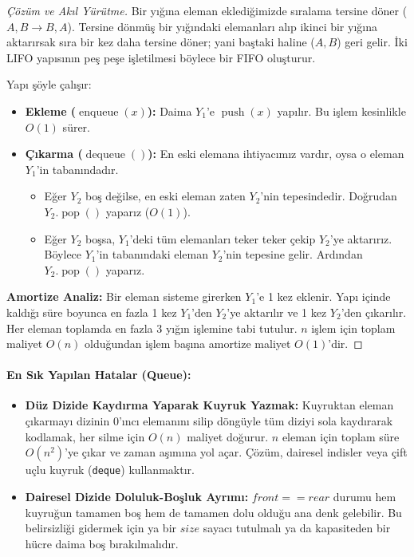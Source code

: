 \begin{proof}[Çözüm ve Akıl Yürütme]
Bir yığına eleman eklediğimizde sıralama tersine döner ($A, B \to B, A$). Tersine dönmüş bir yığındaki elemanları alıp ikinci bir yığına aktarırsak sıra bir kez daha tersine döner; yani baştaki haline ($A, B$) geri gelir. İki LIFO yapısının peş peşe işletilmesi böylece bir FIFO oluşturur.

Yapı şöyle çalışır:
\begin{itemize}
    \item \textbf{Ekleme ($\operatorname{enqueue}(x)$):} Daima $Y_1$'e $\operatorname{push}(x)$ yapılır. Bu işlem kesinlikle $O(1)$ sürer.
    \item \textbf{Çıkarma ($\operatorname{dequeue}()$):} En eski elemana ihtiyacımız vardır, oysa o eleman $Y_1$'in tabanındadır. 
    \begin{itemize}
        \item Eğer $Y_2$ boş değilse, en eski eleman zaten $Y_2$'nin tepesindedir. Doğrudan $Y_2.\operatorname{pop}()$ yaparız ($O(1)$).
        \item Eğer $Y_2$ boşsa, $Y_1$'deki tüm elemanları teker teker çekip $Y_2$'ye aktarırız. Böylece $Y_1$'in tabanındaki eleman $Y_2$'nin tepesine gelir. Ardından $Y_2.\operatorname{pop}()$ yaparız.
    \end{itemize}
\end{itemize}

\textbf{Amortize Analiz:} Bir eleman sisteme girerken $Y_1$'e 1 kez eklenir. Yapı içinde kaldığı süre boyunca en fazla 1 kez $Y_1$'den $Y_2$'ye aktarılır ve 1 kez $Y_2$'den çıkarılır. Her eleman toplamda en fazla 3 yığın işlemine tabi tutulur. $n$ işlem için toplam maliyet $O(n)$ olduğundan işlem başına amortize maliyet $O(1)$'dir.
\end{proof}

\paragraph{En Sık Yapılan Hatalar (Queue):}
\begin{itemize}
    \item \textbf{Düz Dizide Kaydırma Yaparak Kuyruk Yazmak:} Kuyruktan eleman çıkarmayı dizinin $0$'ıncı elemanını silip döngüyle tüm diziyi sola kaydırarak kodlamak, her silme için $O(n)$ maliyet doğurur. $n$ eleman için toplam süre $O(n^2)$'ye çıkar ve zaman aşımına yol açar. Çözüm, dairesel indisler veya çift uçlu kuyruk (\texttt{deque}) kullanmaktır.
    \item \textbf{Dairesel Dizide Doluluk-Boşluk Ayrımı:} $front == rear$ durumu hem kuyruğun tamamen boş hem de tamamen dolu olduğu ana denk gelebilir. Bu belirsizliği gidermek için ya bir $size$ sayacı tutulmalı ya da kapasiteden bir hücre daima boş bırakılmalıdır.
\end{itemize}

